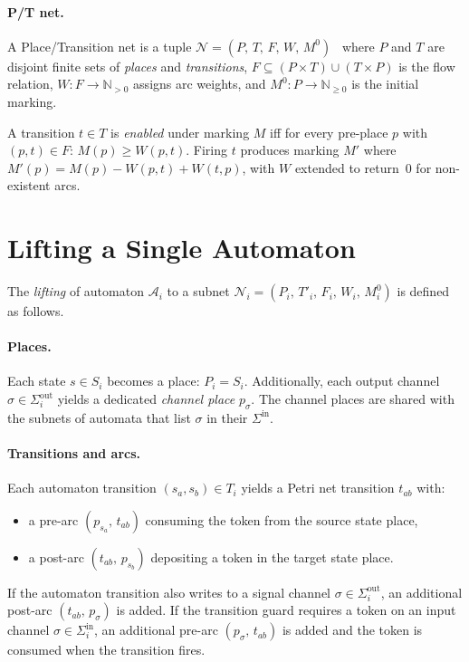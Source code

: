 \paragraph{P/T net.}
A Place/Transition net is a tuple $\mathcal{N} = (P,\, T,\, F,\, W,\, M^0)$~\cite{Murata1989} where $P$ and $T$ are disjoint finite sets of \textit{places} and \textit{transitions}, $F \subseteq (P \times T) \cup (T \times P)$ is the flow relation, $W : F \to \mathbb{N}_{>0}$ assigns arc weights, and $M^0 : P \to \mathbb{N}_{\geq 0}$ is the initial marking.

A transition $t \in T$ is \textit{enabled} under marking $M$ iff for every pre-place $p$ with $(p,t) \in F$: $M(p) \geq W(p,t)$. Firing $t$ produces marking $M'$ where $M'(p) = M(p) - W(p,t) + W(t,p)$, with $W$ extended to return~0 for non-existent arcs.

\section{Lifting a Single Automaton}
\label{sec:petri-lifting}

The \textit{lifting} of automaton $\mathcal{A}_i$ to a subnet $\mathcal{N}_i = (P_i,\, T'_i,\, F_i,\, W_i,\, M^0_i)$ is defined as follows.

\paragraph{Places.}
Each state $s \in S_i$ becomes a place: $P_i = S_i$. Additionally, each output channel $\sigma \in \Sigma^{\mathrm{out}}_i$ yields a dedicated \textit{channel place} $p_\sigma$. The channel places are shared with the subnets of automata that list $\sigma$ in their $\Sigma^{\mathrm{in}}$.

\paragraph{Transitions and arcs.}
Each automaton transition $(s_a, s_b) \in T_i$ yields a Petri net transition $t_{ab}$ with:
\begin{itemize}
  \item a pre-arc $(p_{s_a},\, t_{ab})$ consuming the token from the source state place,
  \item a post-arc $(t_{ab},\, p_{s_b})$ depositing a token in the target state place.
\end{itemize}
If the automaton transition also writes to a signal channel $\sigma \in \Sigma^{\mathrm{out}}_i$, an additional post-arc $(t_{ab},\, p_\sigma)$ is added. If the transition guard requires a token on an input channel $\sigma \in \Sigma^{\mathrm{in}}_i$, an additional pre-arc $(p_\sigma,\, t_{ab})$ is added and the token is consumed when the transition fires.

